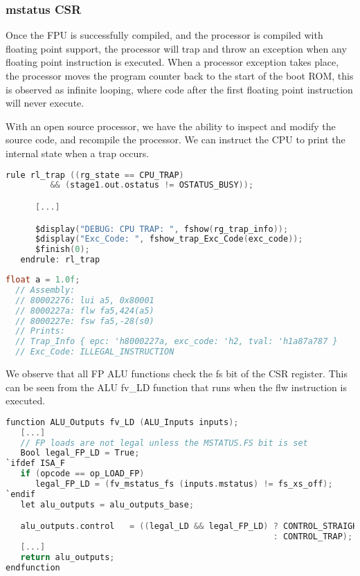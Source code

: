 \documentclass[a4paper,9pt]{report}
\begin{document}
\subsubsection{mstatus CSR}
Once the FPU is successfully compiled, and the processor is compiled with
floating point support, the processor will trap and throw an exception when any
floating point instruction is executed. When a processor exception takes place,
the processor moves the program counter back to the start of the boot ROM, this
is observed as infinite looping, where code after the first floating point
instruction will never execute.

With an open source processor, we have the ability to inspect and modify the source code,
and recompile the processor. We can instruct the CPU to print the internal state
when a trap occurs.

\begin{lstlisting}[language=C,style=customc]
   rule rl_trap ((rg_state == CPU_TRAP)
		 && (stage1.out.ostatus != OSTATUS_BUSY));

      [...]

      $display("DEBUG: CPU TRAP: ", fshow(rg_trap_info));
      $display("Exc_Code: ", fshow_trap_Exc_Code(exc_code));
      $finish(0);
   endrule: rl_trap
\end{lstlisting}
\begin{lstlisting}[language=C,style=customc]
  float a = 1.0f;
  // Assembly:
  // 80002276: lui a5, 0x80001
  // 8000227a: flw fa5,424(a5)
  // 8000227e: fsw fa5,-28(s0)
  // Prints:
  // Trap_Info { epc: 'h8000227a, exc_code: 'h2, tval: 'h1a87a787 }
  // Exc_Code: ILLEGAL_INSTRUCTION
\end{lstlisting}

We observe that all FP ALU functions check the fs bit of the CSR register.
This can be seen from the ALU fv\_LD function that runs when the flw instruction
is executed.
\begin{lstlisting}[language=C,style=customc]
function ALU_Outputs fv_LD (ALU_Inputs inputs);
   [...]
   // FP loads are not legal unless the MSTATUS.FS bit is set
   Bool legal_FP_LD = True;
`ifdef ISA_F
   if (opcode == op_LOAD_FP)
      legal_FP_LD = (fv_mstatus_fs (inputs.mstatus) != fs_xs_off);
`endif
   let alu_outputs = alu_outputs_base;

   alu_outputs.control   = ((legal_LD && legal_FP_LD) ? CONTROL_STRAIGHT
                                                      : CONTROL_TRAP);
   [...]
   return alu_outputs;
endfunction
\end{lstlisting}
\end{document}
